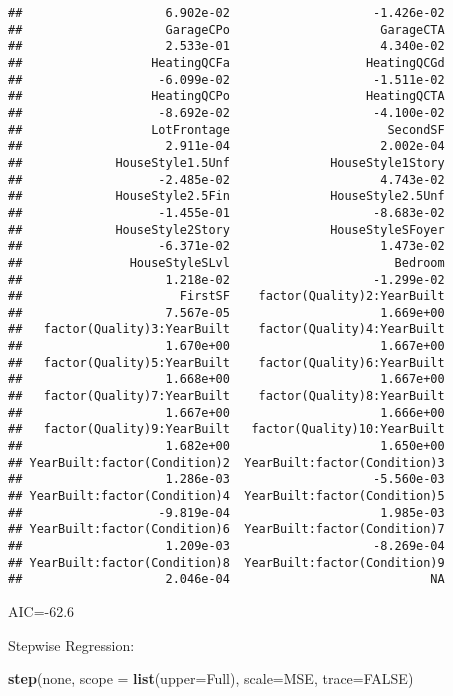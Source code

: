 \documentclass[
]{article}
\newenvironment{Shaded}{\begin{snugshade}}{\end{snugshade}}
\newcommand{\DataTypeTok}[1]{\textcolor[rgb]{0.13,0.29,0.53}{#1}}
\newcommand{\KeywordTok}[1]{\textcolor[rgb]{0.13,0.29,0.53}{\textbf{#1}}}
\newcommand{\NormalTok}[1]{#1}
\newcommand{\OtherTok}[1]{\textcolor[rgb]{0.56,0.35,0.01}{#1}}
\begin{document}
\begin{verbatim}
##                    6.902e-02                    -1.426e-02  
##                    GarageCPo                     GarageCTA  
##                    2.533e-01                     4.340e-02  
##                  HeatingQCFa                   HeatingQCGd  
##                   -6.099e-02                    -1.511e-02  
##                  HeatingQCPo                   HeatingQCTA  
##                   -8.692e-02                    -4.100e-02  
##                  LotFrontage                      SecondSF  
##                    2.911e-04                     2.002e-04  
##             HouseStyle1.5Unf              HouseStyle1Story  
##                   -2.485e-02                     4.743e-02  
##             HouseStyle2.5Fin              HouseStyle2.5Unf  
##                   -1.455e-01                    -8.683e-02  
##             HouseStyle2Story              HouseStyleSFoyer  
##                   -6.371e-02                     1.473e-02  
##               HouseStyleSLvl                       Bedroom  
##                    1.218e-02                    -1.299e-02  
##                      FirstSF    factor(Quality)2:YearBuilt  
##                    7.567e-05                     1.669e+00  
##   factor(Quality)3:YearBuilt    factor(Quality)4:YearBuilt  
##                    1.670e+00                     1.667e+00  
##   factor(Quality)5:YearBuilt    factor(Quality)6:YearBuilt  
##                    1.668e+00                     1.667e+00  
##   factor(Quality)7:YearBuilt    factor(Quality)8:YearBuilt  
##                    1.667e+00                     1.666e+00  
##   factor(Quality)9:YearBuilt   factor(Quality)10:YearBuilt  
##                    1.682e+00                     1.650e+00  
## YearBuilt:factor(Condition)2  YearBuilt:factor(Condition)3  
##                    1.286e-03                    -5.560e-03  
## YearBuilt:factor(Condition)4  YearBuilt:factor(Condition)5  
##                   -9.819e-04                     1.985e-03  
## YearBuilt:factor(Condition)6  YearBuilt:factor(Condition)7  
##                    1.209e-03                    -8.269e-04  
## YearBuilt:factor(Condition)8  YearBuilt:factor(Condition)9  
##                    2.046e-04                            NA
\end{verbatim}

AIC=-62.6

Stepwise Regression:

\begin{Shaded}
\begin{Highlighting}[]
\KeywordTok{step}\NormalTok{(none, }\DataTypeTok{scope =} \KeywordTok{list}\NormalTok{(}\DataTypeTok{upper=}\NormalTok{Full), }\DataTypeTok{scale=}\NormalTok{MSE, }\DataTypeTok{trace=}\OtherTok{FALSE}\NormalTok{)}
\end{Highlighting}
\end{Shaded}
\end{document}
